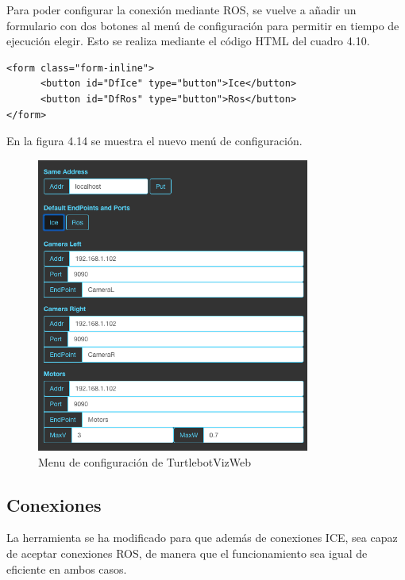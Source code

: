 Para poder configurar la conexión mediante ROS, se vuelve a añadir un formulario con dos botones al menú de configuración para permitir en tiempo de ejecución elegir. Esto se realiza mediante el código HTML del cuadro 4.10.

\begin{lstlisting}[caption= Formulario para seleccionar el \textit{middleware} de comunicación, label=cod.formularioturtlebot]
<form class="form-inline">
      <button id="DfIce" type="button">Ice</button>
      <button id="DfRos" type="button">Ros</button>
</form>
\end{lstlisting}

En la figura 4.14 se muestra el nuevo menú de configuración.

\begin{figure}[H]
  \begin{center}
    \includegraphics[width=0.8\textwidth]{figures/configturtlebot.png}
		\caption{Menu de configuración de TurtlebotVizWeb}
		\label{fig.configturtlebot}
		\end{center}
\end{figure}

\subsection{Conexiones}
La herramienta se ha modificado para que además de conexiones ICE, sea capaz de aceptar conexiones ROS, de manera que el funcionamiento sea igual de eficiente en ambos casos.


